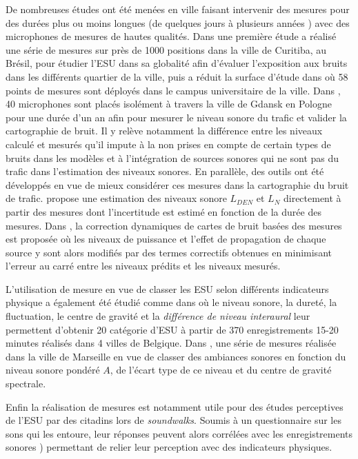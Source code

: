 De nombreuses études ont été menées en ville faisant intervenir des mesures pour des durées plus ou moins longues (de quelques jours \cite{romeu2011street} à plusieurs années \cite{gaja2003sampling}) avec des microphones de mesures de hautes qualités. Dans une première étude \cite{zannin2002environmental} a réalisé une série de mesures sur près de 1000 positions dans la ville de Curitiba, au Brésil, pour étudier l'ESU dans sa globalité afin d'évaluer l'exposition aux bruits dans les différents quartier de la ville, puis a réduit la surface d'étude dans \cite{zannin_characterization_2013} où 58 points de mesures sont déployés dans le campus universitaire de la ville. 
Dans \cite{Mioduszewski}, 40 microphones sont placés isolément à travers la ville de Gdansk en Pologne pour une durée d'un an afin pour mesurer le niveau sonore du trafic et valider la cartographie de bruit. Il y relève notamment la différence entre les niveaux calculé et mesurés qu'il impute à la non prises en compte de certain types de bruits dans les modèles et à l'intégration de sources sonores qui ne sont pas du trafic dans l'estimation des niveaux sonores.
En parallèle, des outils ont été développés en vue de mieux considérer ces mesures dans la cartographie du bruit de trafic. \cite{makarewicz_empirical_2011} propose une estimation des niveaux sonore $L_{DEN}$ et $L_N$ directement à partir des mesures dont l'incertitude est estimé en fonction de la durée des mesures. Dans \cite{wei_dynamic_2016}, la correction dynamiques de cartes de bruit basées des mesures est proposée où les niveaux de puissance et l'effet de propagation de chaque source y sont alors modifiés par des termes correctifs obtenues en minimisant l'erreur au carré entre les niveaux prédits et les niveaux mesurés.

L'utilisation de mesure en vue de classer les ESU selon différents indicateurs physique a également été étudié comme dans \cite{rychtarikova2013soundscape} où le niveau sonore, la dureté, la fluctuation, le centre de gravité et la \textit{différence de niveau interaural} leur permettent d'obtenir 20 catégorie d'ESU à partir de 370 enregistrements 15-20 minutes réalisés dans 4 villes de Belgique. Dans \cite{can_describing_2015}, une série de mesures réalisée dans la ville de Marseille en vue de classer des ambiances sonores en fonction du niveau sonore pondéré $A$, de l'écart type de ce niveau et du centre de gravité spectrale. 

Enfin la réalisation de mesures est notamment utile pour des études perceptives de l'ESU par des citadins lors de \textit{soundwalks}. Soumis à un questionnaire sur les sons qui les entoure, leur réponses peuvent alors corrélées avec les enregistrements sonores \cite{brocolini_measurements_2013, hong2013designing}) permettant de relier leur perception avec des indicateurs physiques.\\ 


